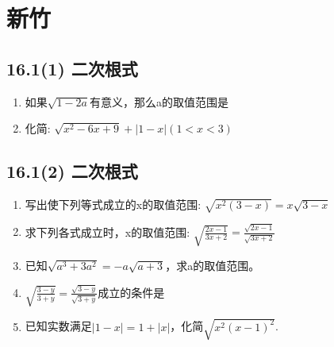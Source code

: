\documentclass[UTF8]{ctexart}
\begin{document}
\section{新竹}

\subsection{16.1(1) 二次根式}

\begin{enumerate}

\item 如果$\sqrt{1-2a}$有意义，那么a的取值范围是\underline{\quad\quad}

\item 化简: $\sqrt{x^2-6x+9} + |1-x|(1<x<3)$

\end{enumerate}

\subsection{16.1(2) 二次根式}

\begin{enumerate}

\item 写出使下列等式成立的x的取值范围: $\sqrt{x^2(3-x)}=x \sqrt{3-x}$

\item 求下列各式成立时，x的取值范围: $\sqrt{\frac{2x-1}{3x+2}}=\frac{\sqrt{2x-1}}{\sqrt{3x+2}}$
   
\item 已知$\sqrt{a^3+3a^2}=-a\sqrt{a+3}$，求a的取值范围。

\item $\sqrt{\frac{3-y}{3+y}}=\frac{\sqrt{3-y}}{\sqrt{3+y}}$成立的条件是\underline{\quad\quad}

\item 已知实数满足$|1-x|=1+|x|$，化简$\sqrt{x^2(x-1)^2}$.

\end{enumerate}

\end{document}
